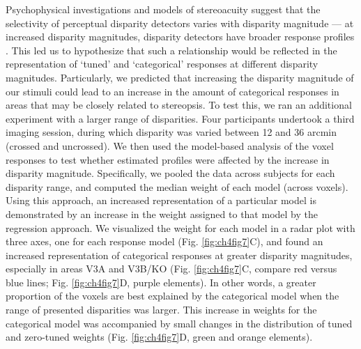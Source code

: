 Psychophysical investigations and models of stereoacuity suggest that the selectivity of perceptual disparity detectors varies with disparity magnitude --- at increased disparity magnitudes, disparity detectors have broader response profiles \cite{Stevenson:1992kx,Lehky:1990fk}. This led us to hypothesize that such a relationship would be reflected in the representation of `tuned' and `categorical' responses at different disparity magnitudes. Particularly, we predicted that increasing the disparity magnitude of our stimuli could lead to an increase in the amount of categorical responses in areas that may be closely related to stereopsis. To test this, we ran an additional experiment with a larger range of disparities. Four participants undertook a third imaging session, during which disparity was varied between 12 and 36 arcmin (crossed and uncrossed). We then used the model-based analysis of the voxel responses to test whether estimated profiles were affected by the increase in disparity magnitude. Specifically, we pooled the data across subjects for each disparity range, and computed the median weight of each model (across voxels). Using this approach, an increased representation of a particular model is demonstrated by an increase in the weight assigned to that model by the regression approach. We visualized the weight for each model in a radar plot with three axes, one for each response model (Fig. \ref{fig:ch4fig7}C), and found an increased representation of categorical responses at greater disparity magnitudes, especially in areas V3A and V3B/KO (Fig. \ref{fig:ch4fig7}C, compare red versus blue lines; Fig. \ref{fig:ch4fig7}D, purple elements). In other words, a greater proportion of the voxels are best explained by the categorical model when the range of presented disparities was larger. This increase in weights for the categorical model was accompanied by small changes in the distribution of tuned and zero-tuned weights (Fig. \ref{fig:ch4fig7}D, green and orange elements). 
